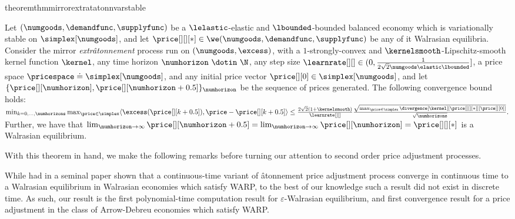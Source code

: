 \begin{restatable}{theorem}{thmmirrorextratatonnvarstable}\label{thm:mirror_extratatonn_var_stable}
    
    Let $(\numgoods, \demandfunc, \supplyfunc)$ be a $\lelastic$-elastic and $\lbounded$-bounded balanced economy which is variationally stable on $\simplex[\numgoods]$, and let $\price[][][*] \in \we(\numgoods, \demandfunc, \supplyfunc)$ be any of it Walrasian equilibria.
    Consider the mirror \emph{extr\^atonnement} process run on $(\numgoods, \excess)$, with a $1$-strongly-convex and $\kernelsmooth$-Lipschitz-smooth kernel function $\kernel$, any time horizon $\numhorizon \ \dotin \  \N$, any step size $\learnrate[ ][ ] \in (0, \frac{1}{2\sqrt{2}\numgoods \elastic \lbounded}]$, a price space $\pricespace \doteq \simplex[\numgoods]$, and any initial price vector $\price[][0] \in \simplex[\numgoods]$, and let $\{\price[][\numhorizon], \price[][\numhorizon + 0.5] \}_{\numhorizon}$ be the sequence of prices generated. The following convergence bound holds: 
$
        \min_{k = 0, \hdots, \numhorizons} \max_{\price \in \simplex} \langle \excess(\price[][k+0.5]),  \price - \price[][k+0.5] \rangle \leq  \frac{2 \sqrt{2}(1 + \kernelsmooth)}{\learnrate[ ][ ]} \frac{\sqrt{\max_{\price \in \simplex}\divergence[\kernel][{\price[][][*]}][{\price[][0]}]}}{\sqrt{\numhorizons}}.
$
    Further, we have that $\lim_{\numhorizon \to \infty} \price[][\numhorizon+0.5] = \lim_{\numhorizon \to \infty} \price[][\numhorizon] = \price[][][*]$ is a Walrasian equilibrium.
\end{restatable}

 
With this theorem in hand, we make the following remarks before turning our attention to second order price adjustment processes.

\begin{remark}[Contribution]
    While \citet{arrow-hurwicz} had in a seminal paper shown that a continuous-time variant of \emt\^atonnement price adjustment process converge in continuous time to a Walrasian equilibrium in Walrasian economies which satisfy WARP, to the best of our knowledge such a result did not exist in discrete time. As such, our result is the first polynomial-time computation result for $\varepsilon$-Walrasian equilibrium, and first convergence result for a price adjustment in the class of Arrow-Debreu economies which satisfy WARP. 
\end{remark}

